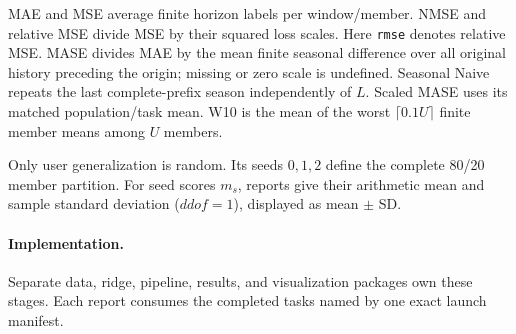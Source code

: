 \documentclass[11pt]{article}
\begin{document}
MAE and MSE average finite horizon labels per window/member. NMSE and relative
MSE divide MSE by their squared loss scales. Here \texttt{rmse} denotes
relative MSE. MASE divides MAE by the mean finite seasonal difference over all
original history preceding the origin; missing or zero scale is undefined.
Seasonal Naive repeats the last complete-prefix season independently of $L$.
Scaled MASE uses its matched population/task mean. W10 is the mean of the worst
$\lceil0.1U\rceil$ finite member means among $U$ members.

Only user generalization is random. Its seeds $0,1,2$ define the complete
80/20 member partition. For seed scores $m_s$, reports give their arithmetic
mean and sample standard deviation ($ddof=1$), displayed as mean $\pm$ SD.

\paragraph{Implementation.} Separate data, ridge, pipeline, results, and
visualization packages own these stages. Each report consumes the completed
tasks named by one exact launch manifest.
\end{document}
